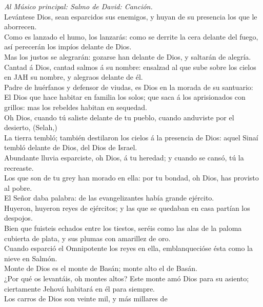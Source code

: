  \emph{Al Músico principal: Salmo de David: Canción.}\\
Levántese Dios, sean esparcidos sus enemigos, y huyan de su presencia
los que le aborrecen.\\
 Como es lanzado el humo, los lanzarás: como se derrite la
cera delante del fuego, así perecerán los impíos delante de Dios.\\
 Mas los justos se alegrarán: gozarse han delante de Dios, y
saltarán de alegría.\\
 Cantad á Dios, cantad salmos á su nombre: ensalzad al que
sube sobre los cielos en JAH su nombre, y alegraos delante de él.\\
 Padre de huérfanos y defensor de viudas, es Dios en la
morada de su santuario:\\
 El Dios que hace habitar en familia los solos; que saca á
los aprisionados con grillos: mas los rebeldes habitan en sequedad.\\
 Oh Dios, cuando tú saliste delante de tu pueblo, cuando
anduviste por el desierto, (Selah,)\\
 La tierra tembló; también destilaron los cielos á la
presencia de Dios: aquel Sinaí tembló delante de Dios, del Dios de
Israel.\\
 Abundante lluvia esparciste, oh Dios, á tu heredad; y
cuando se cansó, tú la recreaste.\\
 Los que son de tu grey han morado en ella: por tu bondad,
oh Dios, has provisto al pobre.\\
 El Señor daba palabra: de las evangelizantes había grande
ejército.\\
 Huyeron, huyeron reyes de ejércitos; y las que se quedaban
en casa partían los despojos.\\
 Bien que fuisteis echados entre los tiestos, seréis como
las alas de la paloma cubierta de plata, y sus plumas con amarillez de
oro.\\
 Cuando esparció el Omnipotente los reyes en ella,
emblanquecióse ésta como la nieve en Salmón.\\
 Monte de Dios es el monte de Basán; monte alto el de
Basán.\\
 ¿Por qué os levantáis, oh montes altos? Este monte amó
Dios para su asiento; ciertamente Jehová habitará en él para siempre.\\
 Los carros de Dios son veinte mil, y más millares de
